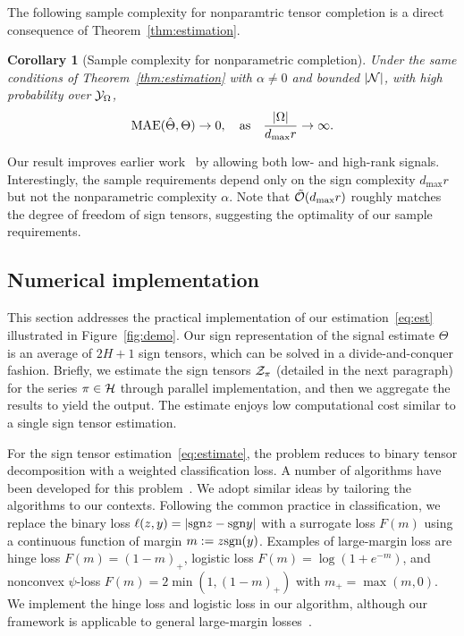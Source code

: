 \documentclass[11pt]{article}
\theoremstyle{plain}
\newtheorem{cor}{Corollary}
\theoremstyle{definition}
\def\sign{\textup{sgn}}
\begin{document}
The following sample complexity for nonparamtric tensor completion is a direct consequence of Theorem~\ref{thm:estimation}. 

\begin{cor}[Sample complexity for nonparametric completion] Under the same conditions of Theorem~\ref{thm:estimation} with $\alpha\neq 0$ and bounded $|\mathcal{N}|$, with high probability over $\mathcal{Y}_\Omega$, 
\[
\textup{MAE}(\hat \Theta, \Theta)\to 0, \quad \text{as}\quad {|\Omega|\over {d_{\max}} r}\to \infty.
\]
\end{cor}
Our result improves earlier work~\citep{yuan2016tensor,ghadermarzy2019near,pmlr-v119-lee20i} by allowing both low- and high-rank signals. Interestingly, the sample requirements depend only on the sign complexity $d_{\max}r$ but not the nonparametric complexity $\alpha$. Note that $\tilde {\mathcal{O}}(d_{\max}r)$ roughly matches the degree of freedom of sign tensors, suggesting the optimality of our sample requirements. 

\subsection{Numerical implementation}
This section addresses the practical implementation of our estimation~\eqref{eq:est} illustrated in Figure~\ref{fig:demo}. Our sign representation of the signal estimate $\hat \Theta$ is an average of $2H+1$ sign tensors, which can be solved in a divide-and-conquer fashion. Briefly, we estimate the sign tensors $\mathcal{Z}_\pi$ (detailed in the next paragraph) for the series $\pi \in \mathcal{H}$ through parallel implementation, and then we aggregate the results to yield the output. The estimate enjoys low computational cost similar to a single sign tensor estimation.  


For the sign tensor estimation~\eqref{eq:estimate}, the problem reduces to binary tensor decomposition with a weighted classification loss. A number of algorithms have been developed for this problem~\citep{ghadermarzy2018learning,wang2018learning,hong2020generalized}. We adopt similar ideas by tailoring the algorithms to our contexts. Following the common practice in classification, we replace the binary loss $\ell(z,y)=|\sign z - \sign y|$ with a surrogate loss $F(m)$ using a continuous function of margin $m:=z\sign(y)$. Examples of large-margin loss are hinge loss $F(m) = (1-m)_+$, logistic loss $F(m) =\log(1+e^{-m})$, and nonconvex $\psi$-loss $F(m)=2\min(1,(1-m)_+)$ with $m_{+}=\max(m,0)$. We implement the hinge loss and logistic loss in our algorithm, although our framework is applicable to general large-margin losses~\citep{bartlett2006convexity}. 
\end{document}
